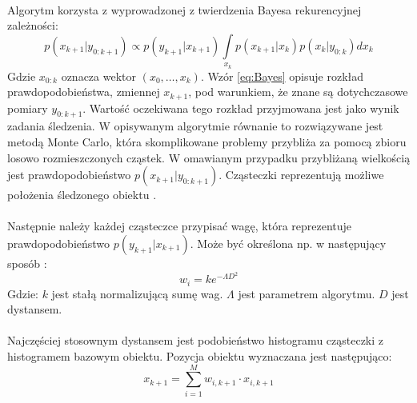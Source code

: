 \paragraph*{}
Algorytm korzysta z wyprowadzonej z twierdzenia Bayesa rekurencyjnej zależności:
\begin{equation}
\label{eq:Bayes}
p(x_{k+1}|y_{0:k+1}) \propto p(y_{k+1}|x_{k+1}) \int\limits_{x_k} p(x_{k+1}|x_k)p(x_k|y_{0:k})dx_k
\end{equation}
\noindent Gdzie \(x_{0:k}\) oznacza wektor \((x_0,\dots,x_k)\).\newline
Wzór \ref{eq:Bayes} opisuje rozkład prawdopodobieństwa, zmiennej \(x_{k+1}\), pod warunkiem, że znane są dotychczasowe pomiary \(y_{0:k+1}\). 
Wartość oczekiwana tego rozkład przyjmowana jest jako wynik zadania śledzenia. 
W opisywanym algorytmie równanie to rozwiązywane jest metodą Monte Carlo, która skomplikowane problemy przybliża za pomocą zbioru losowo rozmieszczonych cząstek. 
W omawianym przypadku przybliżaną wielkością jest prawdopodobieństwo \(p(x_{k+1}|y_{0:k+1})\). 
Cząsteczki reprezentują możliwe położenia śledzonego obiektu \cite{Meresinski}.

\paragraph*{} %
Następnie należy każdej cząsteczce przypisać wagę, która reprezentuje prawdopodobieństwo \(p(y_{k+1}|x_{k+1})\). 
Może być określona np. w następujący sposób \cite{Meresinski}:
\begin{equation}
w_i=ke^{-\Lambda D^2}
\end{equation}
\noindent Gdzie:\newline
\(k\) jest stałą normalizującą sumę wag.\newline
\(\Lambda\) jest parametrem algorytmu.\newline
\(D\) jest dystansem.

\paragraph*{}
Najczęściej stosownym dystansem jest podobieństwo histogramu cząsteczki z histogramem bazowym obiektu. 
Pozycja obiektu wyznaczana jest następująco:
\begin{equation}
\label{eq:PF_polozenie}
x_{k+1}=\sum\limits_{i=1}^{M} w_{i,k+1} \cdot x_{i,k+1}
\end{equation}

